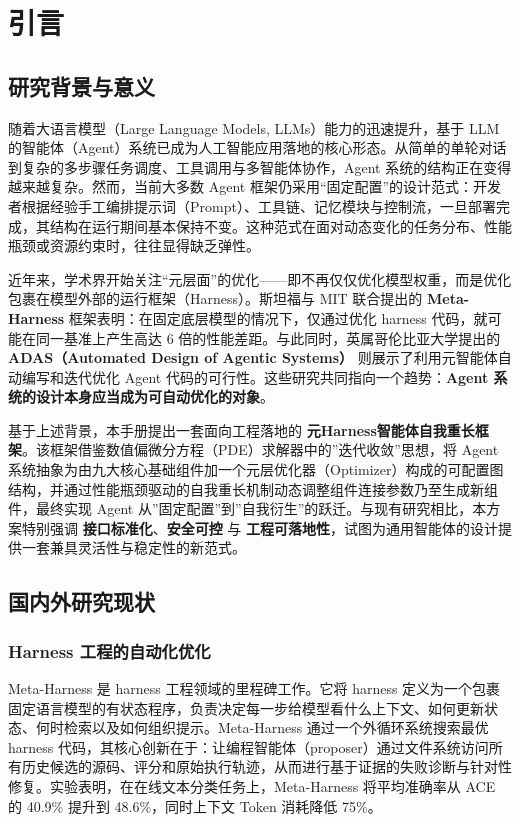 \chapter{引言}

\section{研究背景与意义}

随着大语言模型（Large Language Models, LLMs）能力的迅速提升，基于 LLM 的智能体（Agent）系统已成为人工智能应用落地的核心形态。从简单的单轮对话到复杂的多步骤任务调度、工具调用与多智能体协作，Agent 系统的结构正在变得越来越复杂。然而，当前大多数 Agent 框架仍采用“固定配置”的设计范式：开发者根据经验手工编排提示词（Prompt）、工具链、记忆模块与控制流，一旦部署完成，其结构在运行期间基本保持不变。这种范式在面对动态变化的任务分布、性能瓶颈或资源约束时，往往显得缺乏弹性。

近年来，学术界开始关注“元层面”的优化——即不再仅仅优化模型权重，而是优化包裹在模型外部的运行框架（Harness）。斯坦福与 MIT 联合提出的 \textbf{Meta-Harness} 框架表明：在固定底层模型的情况下，仅通过优化 harness 代码，就可能在同一基准上产生高达 6 倍的性能差距。与此同时，英属哥伦比亚大学提出的 \textbf{ADAS（Automated Design of Agentic Systems）} 则展示了利用元智能体自动编写和迭代优化 Agent 代码的可行性。这些研究共同指向一个趋势：\textbf{Agent 系统的设计本身应当成为可自动优化的对象}。

基于上述背景，本手册提出一套面向工程落地的 \textbf{元Harness智能体自我重长框架}。该框架借鉴数值偏微分方程（PDE）求解器中的”迭代收敛”思想，将 Agent 系统抽象为由九大核心基础组件加一个元层优化器（Optimizer）构成的可配置图结构，并通过性能瓶颈驱动的自我重长机制动态调整组件连接参数乃至生成新组件，最终实现 Agent 从”固定配置”到”自我衍生”的跃迁。与现有研究相比，本方案特别强调 \textbf{接口标准化}、\textbf{安全可控} 与 \textbf{工程可落地性}，试图为通用智能体的设计提供一套兼具灵活性与稳定性的新范式。

\section{国内外研究现状}

\subsection{Harness 工程的自动化优化}

Meta-Harness \cite{lee2026metaharness} 是 harness 工程领域的里程碑工作。它将 harness 定义为一个包裹固定语言模型的有状态程序，负责决定每一步给模型看什么上下文、如何更新状态、何时检索以及如何组织提示。Meta-Harness 通过一个外循环系统搜索最优 harness 代码，其核心创新在于：让编程智能体（proposer）通过文件系统访问所有历史候选的源码、评分和原始执行轨迹，从而进行基于证据的失败诊断与针对性修复。实验表明，在在线文本分类任务上，Meta-Harness 将平均准确率从 ACE 的 40.9\% 提升到 48.6\%，同时上下文 Token 消耗降低 75\%。

